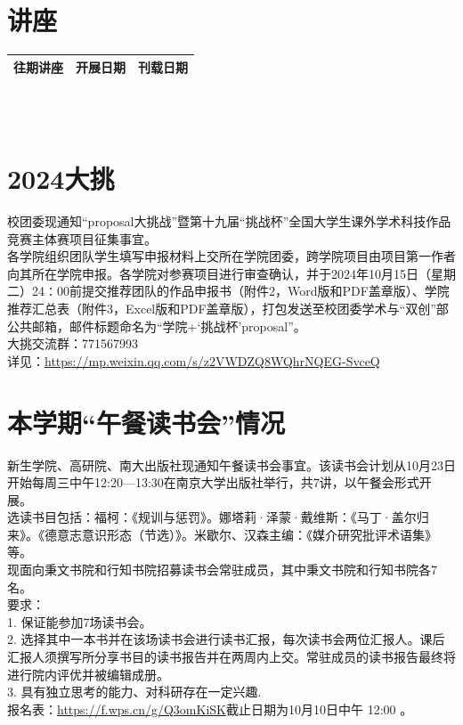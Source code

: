 \documentclass[letterpaper, 12pt]{article}
\begin{document}
\begin{multicols}{2}
\section{讲座}
\begin{tabular}{|c|c|c|}
    \hline
    往期讲座 & 开展日期 & 刊载日期\\
    \hline\hline
      \hline
\end{tabular}\\\\


\section{2024大挑}
校团委现通知“proposal大挑战”暨第十九届“挑战杯”全国大学生课外学术科技作品竞赛主体赛项目征集事宜。\\

各学院组织团队学生填写申报材料上交所在学院团委，跨学院项目由项目第一作者向其所在学院申报。各学院对参赛项目进行审查确认，并于2024年10月15日（星期二）24∶00前提交推荐团队的作品申报书（附件2，Word版和PDF盖章版）、学院推荐汇总表（附件3，Excel版和PDF盖章版），打包发送至校团委学术与“双创”部公共邮箱，邮件标题命名为“学院+‘挑战杯’proposal”。\\
大挑交流群：771567993\\
详见：\url{https://mp.weixin.qq.com/s/z2VWDZQ8WQhrNQEG-SvceQ}

\section{本学期“午餐读书会”情况}
新生学院、高研院、南大出版社现通知午餐读书会事宜。该读书会计划从10月23日开始每周三中午12:20—13:30在南京大学出版社举行，共7讲，以午餐会形式开展。\\
选读书目包括：福柯：《规训与惩罚》。娜塔莉·泽蒙·戴维斯：《马丁·盖尔归来》。《德意志意识形态（节选）》。米歇尔、汉森主编：《媒介研究批评术语集》等。\\
现面向秉文书院和行知书院招募读书会常驻成员，其中秉文书院和行知书院各7名。\\
要求：\\
1. 保证能参加7场读书会。\\
2. 选择其中一本书并在该场读书会进行读书汇报，每次读书会两位汇报人。课后汇报人须撰写所分享书目的读书报告并在两周内上交。常驻成员的读书报告最终将进行院内评优并被编辑成册。\\
3. 具有独立思考的能力、对科研存在一定兴趣.\\
报名表：\url{https://f.wps.cn/g/Q3omKiSK}截止日期为10月10日中午 12:00 。

\end{multicols}
\end{document}
